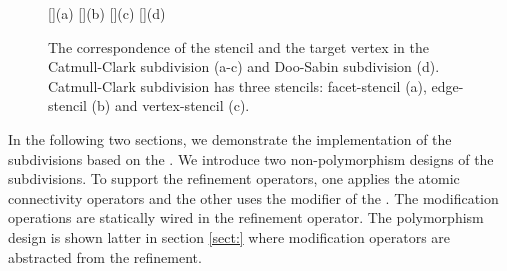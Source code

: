\begin{figure}
  \centering
  []{(a)}
  []{(b)}
  []{(c)}
  []{(d)}
  \caption{The correspondence of the stencil and the 
           target vertex in the Catmull-Clark subdivision (a-c)
	   and Doo-Sabin subdivision (d). Catmull-Clark
	   subdivision has three stencils: facet-stencil (a), 
	   edge-stencil (b) and vertex-stencil (c).}
  \label{fig:RefMap}
\end{figure}

In the following two sections, we demonstrate the implementation of
the subdivisions based on the \cgalpoly.  We introduce two
non-polymorphism designs of the subdivisions.  To support the
refinement operators, one applies the atomic connectivity operators
and the other uses the modifier of the \cgalpoly.  The modification
operations are statically wired in the refinement operator. The
polymorphism design is shown latter in section \ref{sect:} where
modification operators are abstracted from the refinement.
